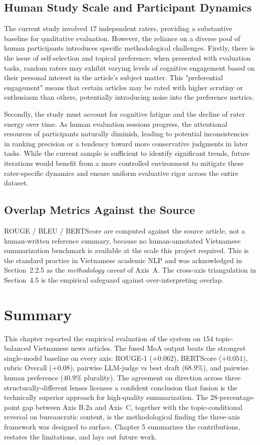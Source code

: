 \subsection{Human Study Scale and Participant Dynamics}

The current study involved $17$ independent raters, providing a substantive 
baseline for qualitative evaluation. However, the reliance on a diverse 
pool of human participants introduces specific methodological challenges. 
Firstly, there is the issue of self-selection and topical preference; 
when presented with evaluation tasks, random raters may exhibit 
varying levels of cognitive engagement based on their personal interest 
in the article's subject matter. This "preferential engagement" means 
that certain articles may be rated with higher scrutiny or enthusiasm 
than others, potentially introducing noise into the preference metrics. 

Secondly, the study must account for cognitive fatigue and the decline of 
rater energy over time. As human evaluation sessions progress, 
the attentional resources of participants naturally diminish, 
leading to potential inconsistencies in ranking precision or a 
tendency toward more conservative judgments in later tasks. 
While the current sample is sufficient to identify significant 
trends, future iterations would benefit from a more controlled 
environment to mitigate these rater-specific dynamics and 
ensure uniform evaluative rigor across the entire dataset.

\subsection{Overlap Metrics Against the Source}

ROUGE / BLEU / BERTScore are computed against the source article, not
a human-written reference summary, because no human-annotated
Vietnamese summarization benchmark is available at the scale this
project required. This is the standard practice in Vietnamese
academic NLP and was acknowledged in Section~2.2.5 as the
\textit{methodology caveat} of Axis~A. The cross-axis triangulation
in Section~4.5 is the empirical safeguard against over-interpreting
overlap.

\section{Summary}

This chapter reported the empirical evaluation of the system on $154$
topic-balanced Vietnamese news articles. The fused MoA output beats
the strongest single-model baseline on every
axis: ROUGE-1 ($+0.062$), BERTScore ($+0.051$), rubric Overall
($+0.08$), pairwise LLM-judge vs best draft ($68.9\%$), and pairwise
human preference ($40.9\%$ plurality). The agreement on direction across three 
structurally-different lenses licenses a confident conclusion that fusion is 
the technically superior approach for high-quality summarization. The 
$28$-percentage-point gap between Axis B.2a and Axis~C, together
with the topic-conditional reversal on bureaucratic content, is the
methodological finding the three-axis framework was designed to
surface. Chapter 5 summarizes the contributions, restates the
limitations, and lays out future work.
